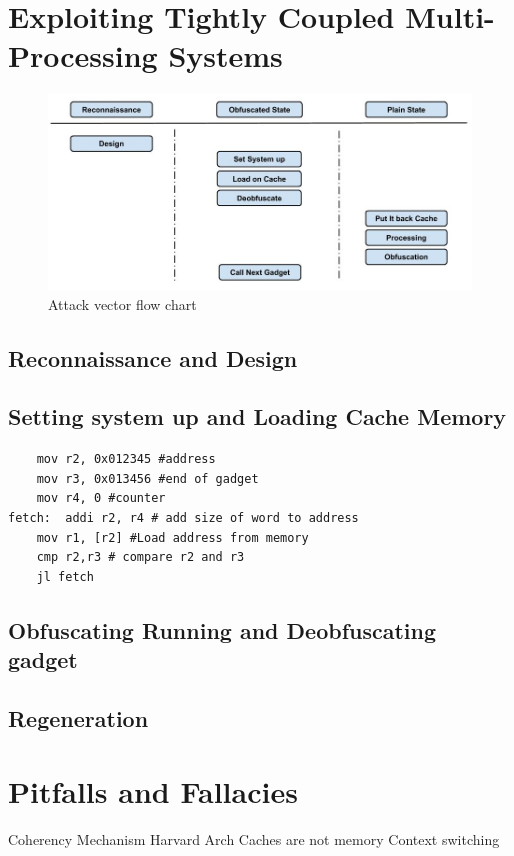 	\section{Exploiting Tightly Coupled Multi-Processing Systems}
	    \begin{figure}[h!]
	        \centering
	        \includegraphics[width=1\textwidth]{img/attack vector.jpg}
	        \caption{Attack vector flow chart}
	        \label{fig:atackvector}
	    \end{figure}
	    \subsection{Reconnaissance and Design}
	    \subsection{Setting system up and Loading Cache Memory}
	    \begin{lstlisting}
	mov r2, 0x012345 #address
	mov r3, 0x013456 #end of gadget
	mov r4, 0 #counter
fetch: 	addi r2, r4 # add size of word to address
	mov r1, [r2] #Load address from memory
	cmp r2,r3 # compare r2 and r3
	jl fetch
\end{lstlisting}

	    \subsection{Obfuscating Running and Deobfuscating gadget}
	    \subsection{Regeneration}
	\section{Pitfalls and Fallacies}
			Coherency Mechanism
			Harvard Arch
			Caches are not memory
			Context switching

